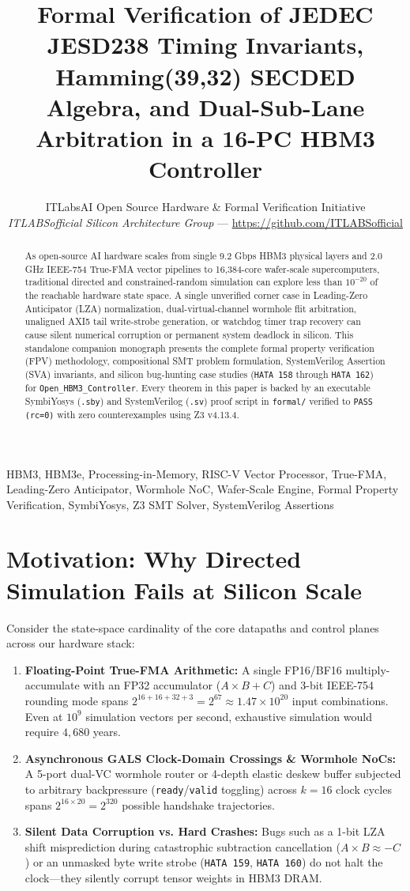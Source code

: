 \documentclass[journal,10pt,twocolumn]{IEEEtran}
\title{Formal Verification of JEDEC JESD238 Timing Invariants, Hamming(39,32) SECDED Algebra, and Dual-Sub-Lane Arbitration in a 16-PC HBM3 Controller}
\author{ITLabsAI Open Source Hardware \& Formal Verification Initiative\\
\textit{ITLABSofficial Silicon Architecture Group} --- \url{https://github.com/ITLABSofficial}}
\begin{document}
\maketitle
\begin{abstract}
As open-source AI hardware scales from single 9.2 Gbps HBM3 physical layers and 2.0 GHz IEEE-754 True-FMA vector pipelines to 16,384-core wafer-scale supercomputers, traditional directed and constrained-random simulation can explore less than $10^{-20}$ of the reachable hardware state space. A single unverified corner case in Leading-Zero Anticipator (LZA) normalization, dual-virtual-channel wormhole flit arbitration, unaligned AXI5 tail write-strobe generation, or watchdog timer trap recovery can cause silent numerical corruption or permanent system deadlock in silicon. This standalone companion monograph presents the complete formal property verification (FPV) methodology, compositional SMT problem formulation, SystemVerilog Assertion (SVA) invariants, and silicon bug-hunting case studies (\texttt{HATA 158} through \texttt{HATA 162}) for \texttt{Open\_HBM3\_Controller}. Every theorem in this paper is backed by an executable SymbiYosys (\texttt{.sby}) and SystemVerilog (\texttt{.sv}) proof script in \texttt{formal/} verified to \texttt{PASS (rc=0)} with zero counterexamples using Z3 v4.13.4.
\end{abstract}
\begin{IEEEkeywords}
HBM3, HBM3e, Processing-in-Memory, RISC-V Vector Processor, True-FMA, Leading-Zero Anticipator, Wormhole NoC, Wafer-Scale Engine, Formal Property Verification, SymbiYosys, Z3 SMT Solver, SystemVerilog Assertions
\end{IEEEkeywords}


\section{Motivation: Why Directed Simulation Fails at Silicon Scale}

Consider the state-space cardinality of the core datapaths and control planes across our hardware stack:
\begin{enumerate}
  \item \textbf{Floating-Point True-FMA Arithmetic:} A single FP16/BF16 multiply-accumulate with an FP32 accumulator ($A \times B + C$) and 3-bit IEEE-754 rounding mode spans $2^{16+16+32+3} = 2^{67} \approx 1.47 \times 10^{20}$ input combinations. Even at $10^9$ simulation vectors per second, exhaustive simulation would require $4,680$ years.
  \item \textbf{Asynchronous GALS Clock-Domain Crossings \& Wormhole NoCs:} A 5-port dual-VC wormhole router or 4-depth elastic deskew buffer subjected to arbitrary backpressure (\texttt{ready}/\texttt{valid} toggling) across $k=16$ clock cycles spans $2^{16 \times 20} = 2^{320}$ possible handshake trajectories.
  \item \textbf{Silent Data Corruption vs. Hard Crashes:} Bugs such as a 1-bit LZA shift misprediction during catastrophic subtraction cancellation ($A \times B \approx -C$) or an unmasked byte write strobe (\texttt{HATA 159}, \texttt{HATA 160}) do not halt the clock—they silently corrupt tensor weights in HBM3 DRAM.
\end{enumerate}
\end{document}
